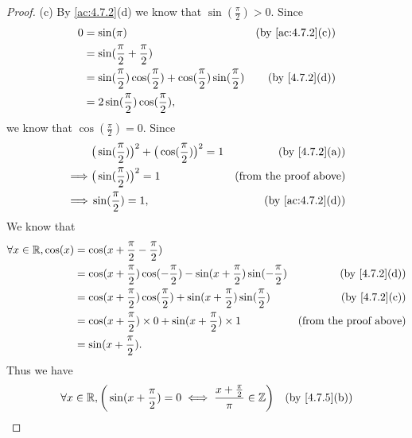 \begin{proof}{(c)}
  By \cref{ac:4.7.2}(d) we know that \(\sin(\frac{\pi}{2}) > 0\).
  Since
  \begin{align*}
    0 & = \sin(\pi)                                                                         & \text{(by \cref{ac:4.7.2}(c))} \\
      & = \sin(\frac{\pi}{2} + \frac{\pi}{2})                                                                                \\
      & = \sin(\frac{\pi}{2}) \cos(\frac{\pi}{2}) + \cos(\frac{\pi}{2}) \sin(\frac{\pi}{2}) & \text{(by \cref{4.7.2}(d))}    \\
      & = 2 \sin(\frac{\pi}{2}) \cos(\frac{\pi}{2}),
  \end{align*}
  we know that \(\cos(\frac{\pi}{2}) = 0\).
  Since
  \begin{align*}
             & \big(\sin(\frac{\pi}{2})\big)^2 + \big(\cos(\frac{\pi}{2})\big)^2 = 1 & \text{(by \cref{4.7.2}(a))}    \\
    \implies & \big(\sin(\frac{\pi}{2})\big)^2 = 1                                   & \text{(from the proof above)}  \\
    \implies & \sin(\frac{\pi}{2}) = 1,                                              & \text{(by \cref{ac:4.7.2}(d))}
  \end{align*}
  We know that
  \begin{align*}
    \forall x \in \R, \cos(x) & = \cos(x + \frac{\pi}{2} - \frac{\pi}{2})                                                                                     \\
                              & = \cos(x + \frac{\pi}{2}) \cos(-\frac{\pi}{2}) - \sin(x + \frac{\pi}{2}) \sin(-\frac{\pi}{2}) & \text{(by \cref{4.7.2}(d))}   \\
                              & = \cos(x + \frac{\pi}{2}) \cos(\frac{\pi}{2}) + \sin(x + \frac{\pi}{2}) \sin(\frac{\pi}{2})   & \text{(by \cref{4.7.2}(c))}   \\
                              & = \cos(x + \frac{\pi}{2}) \times 0 + \sin(x + \frac{\pi}{2}) \times 1                         & \text{(from the proof above)} \\
                              & = \sin(x + \frac{\pi}{2}).
  \end{align*}
  Thus we have
  \begin{align*}
         & \forall x \in \R, \bigg(\sin(x + \frac{\pi}{2}) = 0 \iff \frac{x + \frac{\pi}{2}}{\pi} \in \Z\bigg)    & \text{(by \cref{4.7.5}(b))}   \\

\end{align*}
\end{proof}
